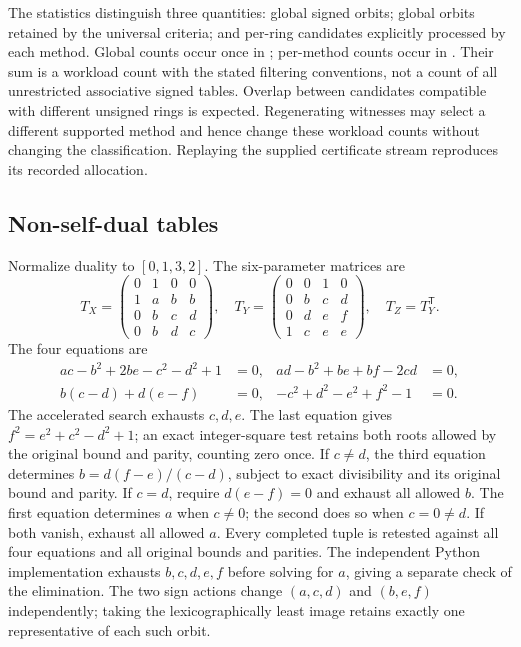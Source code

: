 \documentclass[11pt]{article}
\begin{document}
The statistics distinguish three quantities: global signed orbits;
global orbits retained by the universal criteria; and per-ring
candidates explicitly processed by each method. Global counts occur
once in ; per-method
counts occur in . Their sum
is a workload count with the stated filtering conventions, not a
count of all unrestricted associative signed tables. Overlap between
candidates compatible with different unsigned rings is expected.
Regenerating witnesses may select a different supported method and hence
change these workload counts without changing the classification.
Replaying the supplied certificate stream reproduces its recorded allocation.

\subsection{Non-self-dual tables}
Normalize duality to $[0,1,3,2]$. The six-parameter matrices are
\[
T_X=\begin{pmatrix}0&1&0&0\\1&a&b&b\\0&b&c&d\\0&b&d&c\end{pmatrix},\quad
T_Y=\begin{pmatrix}0&0&1&0\\0&b&c&d\\0&d&e&f\\1&c&e&e\end{pmatrix},\quad
T_Z=T_Y^{\mathsf T}.
\]
The four equations are
\begin{align*}
 ac-b^2+2be-c^2-d^2+1&=0,&ad-b^2+be+bf-2cd&=0,\\
 b(c-d)+d(e-f)&=0,&-c^2+d^2-e^2+f^2-1&=0.
\end{align*}
The accelerated search exhausts $c,d,e$. The last equation gives
$f^2=e^2+c^2-d^2+1$; an exact integer-square test retains both roots
allowed by the original bound and parity, counting zero once.
If $c\ne d$, the third equation determines
$b=d(f-e)/(c-d)$, subject to exact divisibility and its original
bound and parity. If $c=d$, require $d(e-f)=0$ and exhaust all
allowed $b$. The first equation determines $a$ when $c\ne0$;
the second does so when $c=0\ne d$. If both vanish, exhaust all
allowed $a$. Every completed tuple is retested against all four
equations and all original bounds and parities.
The independent Python implementation exhausts $b,c,d,e,f$ before
solving for $a$, giving a separate check of the elimination.
The two sign actions change
$(a,c,d)$ and $(b,e,f)$ independently; taking the lexicographically least
image retains exactly one representative of each such orbit.
\end{document}
